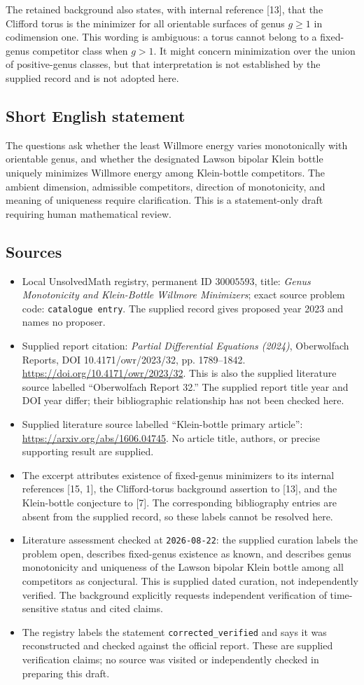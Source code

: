 \documentclass[11pt]{article}
\begin{document}
The retained background also states, with internal reference [13], that the Clifford torus is the minimizer for all orientable surfaces of genus \(g\geq1\) in codimension one. This wording is ambiguous: a torus cannot belong to a fixed-genus competitor class when \(g>1\). It might concern minimization over the union of positive-genus classes, but that interpretation is not established by the supplied record and is not adopted here.
\subsection{Short English statement}
The questions ask whether the least Willmore energy varies monotonically with orientable genus, and whether the designated Lawson bipolar Klein bottle uniquely minimizes Willmore energy among Klein-bottle competitors. The ambient dimension, admissible competitors, direction of monotonicity, and meaning of uniqueness require clarification. This is a statement-only draft requiring human mathematical review.
\subsection{Sources}
\begin{itemize}
\item Local UnsolvedMath registry, permanent ID \(30005593\), title: \emph{Genus Monotonicity and Klein-Bottle Willmore Minimizers}; exact source problem code: \texttt{catalogue entry}. The supplied record gives proposed year 2023 and names no proposer.
\item Supplied report citation: \emph{Partial Differential Equations (2024)}, Oberwolfach Reports, DOI 10.4171/owr/2023/32, pp. 1789--1842. \url{https://doi.org/10.4171/owr/2023/32}. This is also the supplied literature source labelled ``Oberwolfach Report 32.'' The supplied report title year and DOI year differ; their bibliographic relationship has not been checked here.
\item Supplied literature source labelled ``Klein-bottle primary article'': \url{https://arxiv.org/abs/1606.04745}. No article title, authors, or precise supporting result are supplied.
\item The excerpt attributes existence of fixed-genus minimizers to its internal references [15, 1], the Clifford-torus background assertion to [13], and the Klein-bottle conjecture to [7]. The corresponding bibliography entries are absent from the supplied record, so these labels cannot be resolved here.
\item Literature assessment checked at \texttt{2026-08-22}: the supplied curation labels the problem open, describes fixed-genus existence as known, and describes genus monotonicity and uniqueness of the Lawson bipolar Klein bottle among all competitors as conjectural. This is supplied dated curation, not independently verified. The background explicitly requests independent verification of time-sensitive status and cited claims.
\item The registry labels the statement \texttt{corrected\_verified} and says it was reconstructed and checked against the official report. These are supplied verification claims; no source was visited or independently checked in preparing this draft.
\end{itemize}
\end{document}
